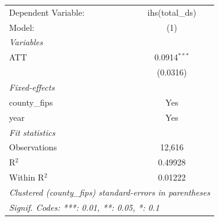 
\begingroup
\centering
\begin{tabular}{lc}
   \tabularnewline \midrule \midrule
   Dependent Variable: & ihs(total\_ds)\\   
   Model:              & (1)\\  
   \midrule
   \emph{Variables}\\
   ATT                 & 0.0914$^{***}$\\   
                       & (0.0316)\\   
   \midrule
   \emph{Fixed-effects}\\
   county\_fips        & Yes\\  
   year                & Yes\\  
   \midrule
   \emph{Fit statistics}\\
   Observations        & 12,616\\  
   R$^2$               & 0.49928\\  
   Within R$^2$        & 0.01222\\  
   \midrule \midrule
   \multicolumn{2}{l}{\emph{Clustered (county\_fips) standard-errors in parentheses}}\\
   \multicolumn{2}{l}{\emph{Signif. Codes: ***: 0.01, **: 0.05, *: 0.1}}\\
\end{tabular}
\par\endgroup


